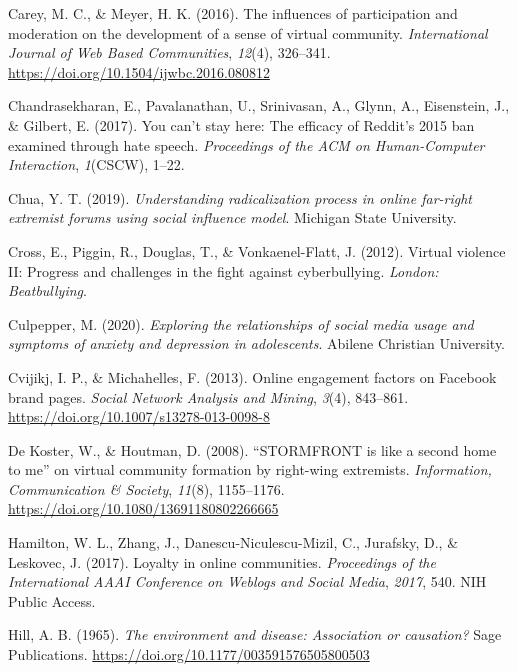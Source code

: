 \documentclass[10pt,dvipsnames]{scrartcl}
\begin{document}
\hypertarget{ref-carey2016influences}{}
Carey, M. C., \& Meyer, H. K. (2016). The influences of participation
and moderation on the development of a sense of virtual community.
\emph{International Journal of Web Based Communities}, \emph{12}(4),
326--341. \url{https://doi.org/10.1504/ijwbc.2016.080812}

\hypertarget{ref-chandrasekharan2017you}{}
Chandrasekharan, E., Pavalanathan, U., Srinivasan, A., Glynn, A.,
Eisenstein, J., \& Gilbert, E. (2017). You can't stay here: The efficacy
of Reddit's 2015 ban examined through hate speech. \emph{Proceedings of
the ACM on Human-Computer Interaction}, \emph{1}(CSCW), 1--22.

\hypertarget{ref-chua2019understanding}{}
Chua, Y. T. (2019). \emph{Understanding radicalization process in online
far-right extremist forums using social influence model}. Michigan State
University.

\hypertarget{ref-cross2012virtual}{}
Cross, E., Piggin, R., Douglas, T., \& Vonkaenel-Flatt, J. (2012).
Virtual violence II: Progress and challenges in the fight against
cyberbullying. \emph{London: Beatbullying}.

\hypertarget{ref-culpepperexploring}{}
Culpepper, M. (2020). \emph{Exploring the relationships of social media
usage and symptoms of anxiety and depression in adolescents}. Abilene
Christian University.

\hypertarget{ref-cvijikj2013online}{}
Cvijikj, I. P., \& Michahelles, F. (2013). Online engagement factors on
Facebook brand pages. \emph{Social Network Analysis and Mining},
\emph{3}(4), 843--861. \url{https://doi.org/10.1007/s13278-013-0098-8}

\hypertarget{ref-de2008stormfront}{}
De Koster, W., \& Houtman, D. (2008). ``STORMFRONT is like a second home
to me'' on virtual community formation by right-wing extremists.
\emph{Information, Communication \& Society}, \emph{11}(8), 1155--1176.
\url{https://doi.org/10.1080/13691180802266665}

\hypertarget{ref-hamilton2017loyalty}{}
Hamilton, W. L., Zhang, J., Danescu-Niculescu-Mizil, C., Jurafsky, D.,
\& Leskovec, J. (2017). Loyalty in online communities. \emph{Proceedings
of the International AAAI Conference on Weblogs and Social Media},
\emph{2017}, 540. NIH Public Access.

\hypertarget{ref-hill1965environment}{}
Hill, A. B. (1965). \emph{The environment and disease: Association or
causation?} Sage Publications.
\url{https://doi.org/10.1177/003591576505800503}
\end{document}
